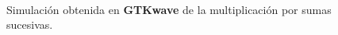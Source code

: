 \documentclass[twocolumn]{IEEEtran}
\begin{document}
\begin{figure}[]
    \begin{minipage}[t]{1cm}
    \centering
    \end{minipage}\\
    \begin{minipage}[H]{1cm}
    \centering
    \end{minipage}\\
    \begin{minipage}[H]{1cm}
    \centering
    \end{minipage}\\
    \begin{minipage}[H]{1cm}
    \centering
    \end{minipage}
\caption{Simulación obtenida en \textbf{GTKwave} de la multiplicación por sumas sucesivas.}
\label{fig15}
\end{figure}
\end{document}
